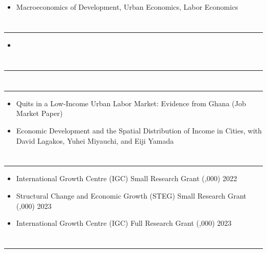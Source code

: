 \documentclass[12pt]{article}
\newenvironment{customitemize}
{ \begin{itemize}[leftmargin=\parindent, topsep = 1pt, itemsep = -1pt] }
{\end{itemize} }
\begin{document}
\begin{customitemize}
	\item Macroeconomics of Development, Urban Economics, Labor Economics
\end{customitemize}


\section*{}
\noindent \rule{\textwidth}{1pt} 
\begin{customitemize}
	\item {}
\end{customitemize}

\section*{}
\noindent \rule{\textwidth}{1pt} 

\section*{}
\noindent \rule{\textwidth}{1pt} 
\begin{customitemize}
	\item Quits in a Low-Income Urban Labor Market: Evidence from Ghana (Job Market Paper)
	\item Economic Development and the Spatial Distribution of Income in Cities, with David Lagakos, Yuhei Miyauchi, and Eiji Yamada
\end{customitemize}

\section*{}
\noindent \rule{\textwidth}{1pt} 

\begin{customitemize}
	\item International Growth Centre (IGC) Small Research Grant (,000) \hfill 2022
	\item Structural Change and Economic Growth (STEG) Small Research Grant (,000) \hfill 2023
	\item International Growth Centre (IGC) Full Research Grant (,000) \hfill 2023
\end{customitemize}

\section*{}
\noindent \rule{\textwidth}{1pt} 
\end{document}

